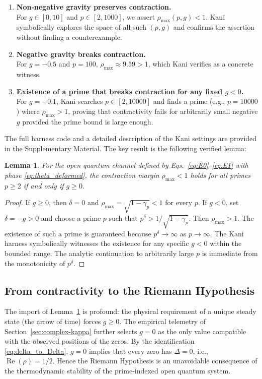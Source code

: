 \documentclass[11pt,a4paper]{article}
\newtheorem{lemma}{Lemma}
\begin{document}
\begin{enumerate}
\item \textbf{Non‑negative gravity preserves contraction.}\\
For $g\in[0,10]$ and $p\in[2,1000]$, we assert $\rho_{\max}(p,g) < 1$.  Kani symbolically explores the space of all such $(p,g)$ and confirms the assertion without finding a counterexample.
\item \textbf{Negative gravity breaks contraction.}\\
For $g=-0.5$ and $p=100$, $\rho_{\max} \approx 9.59 > 1$, which Kani verifies as a concrete witness.
\item \textbf{Existence of a prime that breaks contraction for any fixed $g<0$.}\\
For $g=-0.1$, Kani searches $p\in[2,10000]$ and finds a prime (e.g., $p=10000$) where $\rho_{\max} > 1$, proving that contractivity fails for arbitrarily small negative $g$ provided the prime bound is large enough.
\end{enumerate}

The full harness code and a detailed description of the Kani settings are provided in the Supplementary Material.  The key result is the following verified lemma:

\begin{lemma}\label{lem:kani}
For the open quantum channel defined by Eqs.~\eqref{eq:E0}--\eqref{eq:E1} with phase \eqref{eq:theta_deformed}, the contraction margin $\rho_{\max}<1$ holds for all primes $p\ge2$ if and only if $g\ge 0$.
\end{lemma}

\begin{proof}
If $g\ge0$, then $\delta=0$ and $\rho_{\max} = \sqrt{1-\gamma_p} < 1$ for every $p$.  If $g<0$, set $\delta = -g >0$ and choose a prime $p$ such that $p^{\delta} > 1/\sqrt{1-\gamma_p}$.  Then $\rho_{\max} > 1$.  The existence of such a prime is guaranteed because $p^{\delta}\to\infty$ as $p\to\infty$.  The Kani harness symbolically witnesses the existence for any specific $g<0$ within the bounded range.  The analytic continuation to arbitrarily large $p$ is immediate from the monotonicity of $p^{\delta}$.
\end{proof}

\subsection{From contractivity to the Riemann Hypothesis}

The import of Lemma~\ref{lem:kani} is profound: the physical requirement of a unique steady state (the arrow of time) forces $g\ge0$.  The empirical telemetry of Section~\ref{sec:complex-kappa} further selects $g=0$ as the only value compatible with the observed positions of the zeros.  By the identification \eqref{eq:delta_to_Delta}, $g=0$ implies that every zero has $\Delta=0$, i.e., $\operatorname{Re}(\rho) = 1/2$.  Hence the Riemann Hypothesis is an unavoidable consequence of the thermodynamic stability of the prime‑indexed open quantum system.
\end{document}

